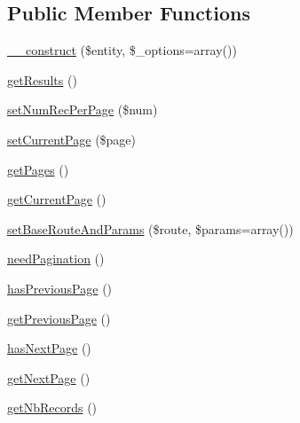 \subsection*{Public Member Functions}
\begin{DoxyCompactItemize}
\item 
\hyperlink{classapp_1_1models_1_1core_1_1_pagination_1_1_paginable_a30665d666343b7d0bc4205bbdd17a9a6}{\-\_\-\-\_\-construct} (\$entity, \$\-\_\-options=array())
\item 
\hyperlink{classapp_1_1models_1_1core_1_1_pagination_1_1_paginable_a3813247f2eae6ac65a8a021daf05bae4}{get\-Results} ()
\item 
\hyperlink{classapp_1_1models_1_1core_1_1_pagination_1_1_paginable_a729c58915f85c0640170ecd38bbbfbde}{set\-Num\-Rec\-Per\-Page} (\$num)
\item 
\hyperlink{classapp_1_1models_1_1core_1_1_pagination_1_1_paginable_a3d3907e74263fd57a5f8e42826a41741}{set\-Current\-Page} (\$page)
\item 
\hyperlink{classapp_1_1models_1_1core_1_1_pagination_1_1_paginable_a9613a9ee3ec2d3c253b6cacde84fb992}{get\-Pages} ()
\item 
\hyperlink{classapp_1_1models_1_1core_1_1_pagination_1_1_paginable_a1162a00ab3a7146680cf51a76bf60c78}{get\-Current\-Page} ()
\item 
\hyperlink{classapp_1_1models_1_1core_1_1_pagination_1_1_paginable_ac9a7c4f8a9092109368193a19ba027d5}{set\-Base\-Route\-And\-Params} (\$route, \$params=array())
\item 
\hyperlink{classapp_1_1models_1_1core_1_1_pagination_1_1_paginable_a3613a2a45ce883e2fae841ab26611473}{need\-Pagination} ()
\item 
\hyperlink{classapp_1_1models_1_1core_1_1_pagination_1_1_paginable_acb7ae38947e4e7f6f703ac7dcaea543e}{has\-Previous\-Page} ()
\item 
\hyperlink{classapp_1_1models_1_1core_1_1_pagination_1_1_paginable_a2ae421a6d6302fa4b340dce8127cad42}{get\-Previous\-Page} ()
\item 
\hyperlink{classapp_1_1models_1_1core_1_1_pagination_1_1_paginable_a5cbe0d19e29e1e5461e810ceeacc8f5a}{has\-Next\-Page} ()
\item 
\hyperlink{classapp_1_1models_1_1core_1_1_pagination_1_1_paginable_a6c0ee4e21328f53e8bea5675924f2d26}{get\-Next\-Page} ()
\item 
\hyperlink{classapp_1_1models_1_1core_1_1_pagination_1_1_paginable_a496821fe216b5e65c39f14f25e09855f}{get\-Nb\-Records} ()
\end{DoxyCompactItemize}


